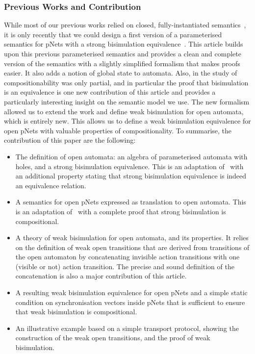 \documentclass{elsarticle}
\begin{document}
\subsubsection*{Previous Works and Contribution}
While most of our previous works relied on closed, fully-instantiated semantics~\cite{BBCHM:article2008,AmeurBoulifa2017,HKM-FASE16}, it is only recently that we could design a first version of a  parameterised semantics for pNets with a strong bisimulation equivalence~\cite{henrio:Forte2016}. This article builds upon this previous parameterised semantics and provides a clean and complete version of the semantics with a slightly simplified formalism that makes proofs easier. It also adds a notion of global state to automata.  Also, in \cite{henrio:Forte2016} the study of compositionability was only partial, and in particular the proof that bisimulation is an equivalence is one new contribution of this article and provides a particularly interesting insight on the semantic model we use.
The new formalism allowed us to extend the work and define weak bisimulation  for open automata, which is entirely new. This allows us to define a weak bisimulation equivalence for open pNets with valuable properties of compositionality. 
To summarise, the contribution of this paper are the following:
\begin{itemize}
\item The definition of open automata: an algebra of parameterised automata with holes, and a strong bisimulation equivalence. This is an adaptation of~\cite{henrio:Forte2016} with an additional property stating that strong bisimulation equivalence is indeed an equivalence relation.
\item A semantics for open pNets expressed as translation to open automata. This is an adaptation of~\cite{henrio:Forte2016} with a complete proof that strong bisimulation is compositional.
\item A theory of weak bisimulation for open automata, and its properties. It relies on the definition of weak open transitions that are derived from transitions of the open automaton by concatenating invisible action transitions with one (visible or not) action transition. The precise and sound definition of the concatenation is also a major contribution of this article.
\item A resulting weak bisimulation equivalence for open pNets and a simple static condition on synchronisation vectors inside pNets that is sufficient to ensure that weak bisimulation is compositional.
\item An illustrative example based on a simple transport protocol, showing the construction of the weak open transitions, and the proof of weak bisimulation.
\end{itemize}
\end{document}
